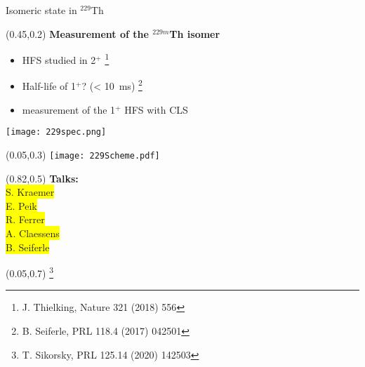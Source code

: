 \documentclass[10pt,aspectratio=169]{beamer}
\begin{document}
\begin{frame}{Isomeric state in $^{229}$Th}
	\begin{textblock*}{0.6\paperwidth}(0.45\paperwidth,0.2\paperheight)
		\textbf{Measurement of the $^{229m}$Th isomer}
		\begin{itemize}
			\item HFS studied in 2$^+$ \footnote{J. Thielking, Nature 321 (2018) 556}
			\item Half-life of 1$^+$? (< 10~ms) \footnote{B. Seiferle, PRL 118.4 (2017) 042501}
			\item measurement of the 1$^+$ HFS with CLS
		\end{itemize}
		
		\texttt{[image: 229spec.png]}
	\end{textblock*}
	\begin{textblock*}{0.33\paperwidth}(0.05\paperwidth,0.3\paperheight)
		\centering
		\texttt{[image: 229Scheme.pdf]}
	\end{textblock*}
	\begin{textblock*}{0.2\paperwidth}(0.82\paperwidth,0.5\paperheight)
		\textbf{Talks:}\\
		\colorbox{yellow}{S. Kraemer}\\
		\colorbox{yellow}{E. Peik}\\
		\colorbox{yellow}{R. Ferrer}\\
		\colorbox{yellow}{A. Claessens}\\
		\colorbox{yellow}{B. Seiferle}\\
	\end{textblock*}
	\begin{textblock*}{0.1\paperwidth}(0.05\paperwidth,0.7\paperheight)
		\footnote{ T. Sikorsky, PRL 125.14 (2020) 142503}
	\end{textblock*}
\end{frame}
\end{document}
